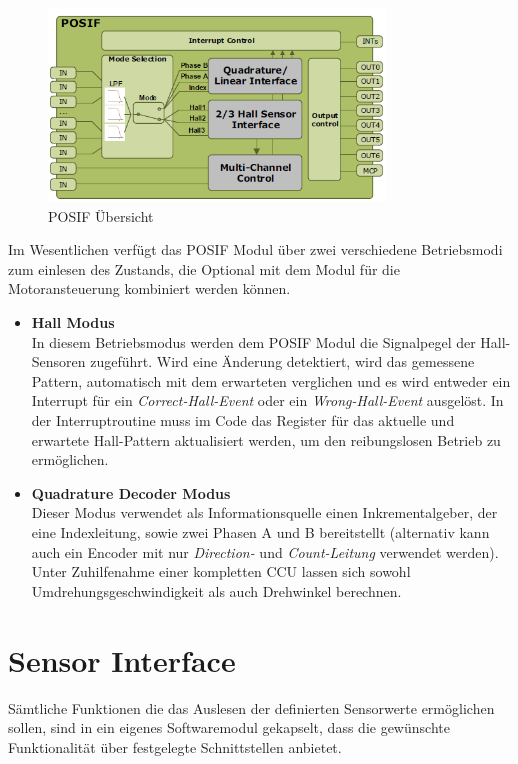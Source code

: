 \begin{figure}[ht]
\centering
\includegraphics[width=0.8\textwidth]{sensor/posif_overview.PNG}
\caption{POSIF Übersicht}
\label{img:posif_overview}
\end{figure}

Im Wesentlichen verfügt das POSIF Modul über zwei verschiedene Betriebsmodi zum einlesen des Zustands, die Optional mit dem Modul für die Motoransteuerung kombiniert werden können.

\begin{itemize}
\item \textbf{Hall Modus} \\
In diesem Betriebsmodus werden dem POSIF Modul die Signalpegel der Hall-Sensoren zugeführt. Wird eine Änderung detektiert, wird das gemessene Pattern, automatisch mit dem erwarteten verglichen und es wird entweder ein Interrupt für ein \textit{Correct-Hall-Event} oder ein \textit{Wrong-Hall-Event} ausgelöst. In der Interruptroutine muss im Code das Register für das aktuelle und erwartete Hall-Pattern aktualisiert werden, um den reibungslosen Betrieb zu ermöglichen.
\item \textbf{Quadrature Decoder Modus} \\
Dieser Modus verwendet als Informationsquelle einen Inkrementalgeber, der eine Indexleitung, sowie zwei Phasen A und B bereitstellt (alternativ kann auch ein Encoder mit nur \textit{Direction-} und \textit{Count-Leitung} verwendet werden). Unter Zuhilfenahme einer kompletten CCU lassen sich sowohl Umdrehungsgeschwindigkeit als auch Drehwinkel berechnen.
\end{itemize}

\section{Sensor Interface}
Sämtliche Funktionen die das Auslesen der definierten Sensorwerte ermöglichen sollen, sind in ein eigenes Softwaremodul gekapselt, dass die gewünschte Funktionalität über festgelegte Schnittstellen anbietet. \\

